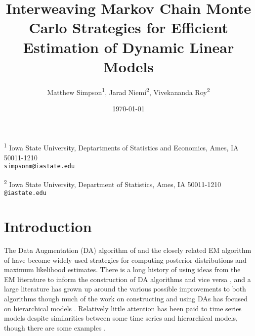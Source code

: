 \documentclass[12pt]{article}
\begin{document}
\title{Interweaving Markov Chain Monte Carlo Strategies for Efficient
Estimation of Dynamic Linear Models}
\author{Matthew Simpson\textsuperscript{1}, Jarad Niemi\textsuperscript{2}, Vivekananda Roy\textsuperscript{2}}
\date{\today}
\maketitle

\begin{center}
 \vspace{-.5em}
 {\small \textsuperscript{1} Iowa State University, Deptartments of Statistics and Economics, Ames, IA 50011-1210\\[-.3em]
 {\tt simpsonm@iastate.edu}}
 
 \vspace{.5em}

{\small \textsuperscript{2} Iowa State University, Department of Statistics, Ames, IA 50011-1210\\[-.3em]
{\tt <niemi,vroy>@iastate.edu}}

\end{center}



\section{Introduction}

The Data Augmentation (DA) algorithm of \citet{tanner1987calculation} and the closely related EM algorithm of \citet{dempster1977maximum} have become widely used strategies for computing posterior distributions and maximum likelihood estimates. There is a long history of using ideas from the EM literature to inform the construction of DA algorithms and vice versa \citep{meng1997algorithm,van2010cross}, and a large literature has grown up around the various possible improvements to both algorithms \citep{meng1997algorithm,meng1999seeking,liu1999parameter,hobert2008theoretical,yu2011center} though much of the work on constructing and using DAs has focused on hierarchical models \citep{gelfand1995efficient,roberts1997updating,meng1998fast,van2001art,bernardo2003non,papaspiliopoulos2007general,papaspiliopoulos2008stability}. Relatively little attention has been paid to time series models despite similarities between some time series and hierarchical models, though there are some examples \citep{pitt1999analytic,fruhwirth2003bayesian,fruhwirth2006auxiliary}. 
\end{document}
